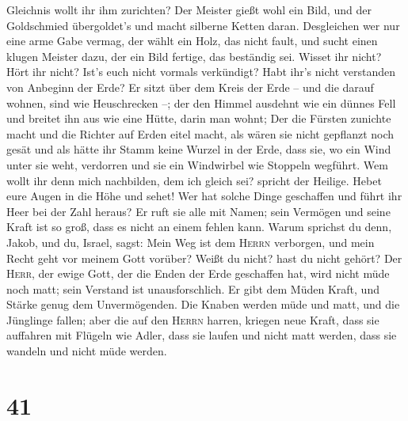 Gleichnis wollt ihr ihm zurichten?  Der Meister gießt
wohl ein Bild, und der Goldschmied übergoldet's und macht silberne
Ketten daran.  Desgleichen wer nur eine arme Gabe vermag,
der wählt ein Holz, das nicht fault, und sucht einen klugen Meister
dazu, der ein Bild fertige, das beständig sei.  Wisset
ihr nicht? Hört ihr nicht? Ist's euch nicht vormals verkündigt? Habt
ihr's nicht verstanden von Anbeginn der Erde?  Er sitzt
über dem Kreis der Erde -- und die darauf wohnen, sind wie Heuschrecken
--; der den Himmel ausdehnt wie ein dünnes Fell und breitet ihn aus wie
eine Hütte, darin man wohnt;  Der die Fürsten zunichte
macht und die Richter auf Erden eitel macht,  als wären
sie nicht gepflanzt noch gesät und als hätte ihr Stamm keine Wurzel in
der Erde, dass sie, wo ein Wind unter sie weht, verdorren und sie ein
Windwirbel wie Stoppeln wegführt.  Wem wollt ihr denn
mich nachbilden, dem ich gleich sei? spricht der Heilige.
 Hebet eure Augen in die Höhe und sehet! Wer hat solche
Dinge geschaffen und führt ihr Heer bei der Zahl heraus? Er ruft sie
alle mit Namen; sein Vermögen und seine Kraft ist so groß, dass es nicht
an einem fehlen kann.  Warum sprichst du denn, Jakob, und
du, Israel, sagst: Mein Weg ist dem \textsc{Herrn} verborgen, und mein
Recht geht vor meinem Gott vorüber?  Weißt du nicht? hast
du nicht gehört? Der \textsc{Herr}, der ewige Gott, der die Enden der
Erde geschaffen hat, wird nicht müde noch matt; sein Verstand ist
unausforschlich.  Er gibt dem Müden Kraft, und Stärke
genug dem Unvermögenden.  Die Knaben werden müde und
matt, und die Jünglinge fallen;  aber die auf den
\textsc{Herrn} harren, kriegen neue Kraft, dass sie auffahren mit
Flügeln wie Adler, dass sie laufen und nicht matt werden, dass sie
wandeln und nicht müde werden.

\hypertarget{section-40}{%
\section{41}\label{section-40}}


